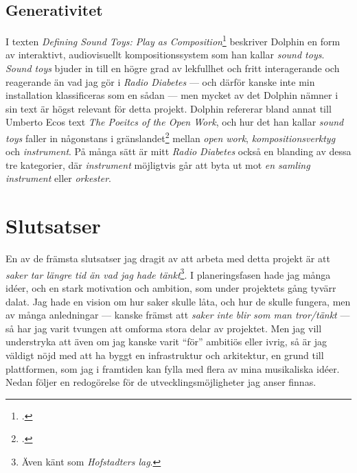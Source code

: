 \documentclass[11pt, a4paper]{article} %
\begin{document}
\subsection*{Generativitet}
I texten \emph{Defining Sound Toys: Play as Composition}\footcite{collins_defining_2014} beskriver Dolphin en form av interaktivt, audiovisuellt kompositionssystem som han kallar \emph{sound toys}. \emph{Sound toys} bjuder in till en högre grad av lekfullhet och fritt interagerande och reagerande än vad jag gör i \emph{Radio Diabetes} --- och därför kanske inte min installation klassificeras som en sådan --- men mycket av det Dolphin nämner i sin text är högst relevant för detta projekt. Dolphin refererar bland annat till Umberto Ecos text \emph{The Poeitcs of the Open Work}, och hur det han kallar \emph{sound toys} faller in någonstans i gränslandet\footcite[53]{collins_defining_2014} mellan \emph{open work}, \emph{kompositionsverktyg} och \emph{instrument}. På många sätt är mitt \emph{Radio Diabetes} också en blanding av dessa tre kategorier, där \emph{instrument} möjligtvis går att byta ut mot \emph{en samling instrument} eller \emph{orkester}. 

\section*{Slutsatser}
En av de främsta slutsatser jag dragit av att arbeta med detta projekt är att \emph{saker tar längre tid än vad jag hade tänkt}\footnote{Även känt som \emph{Hofstadters lag}.}. I planeringsfasen hade jag många idéer, och en stark motivation och ambition, som under projektets gång tyvärr dalat. Jag hade en vision om hur saker skulle låta, och hur de skulle fungera, men av många anledningar --- kanske främst att \emph{saker inte blir som man tror/tänkt} --- så har jag varit tvungen att omforma stora delar av projektet. Men jag vill understryka att även om jag kanske varit ``för'' ambitiös eller ivrig, så är jag väldigt nöjd med att ha byggt en infrastruktur och arkitektur, en grund till plattformen, som jag i framtiden kan fylla med flera av mina musikaliska idéer. Nedan följer en redogörelse för de utvecklingsmöjligheter jag anser finnas.
\end{document}
